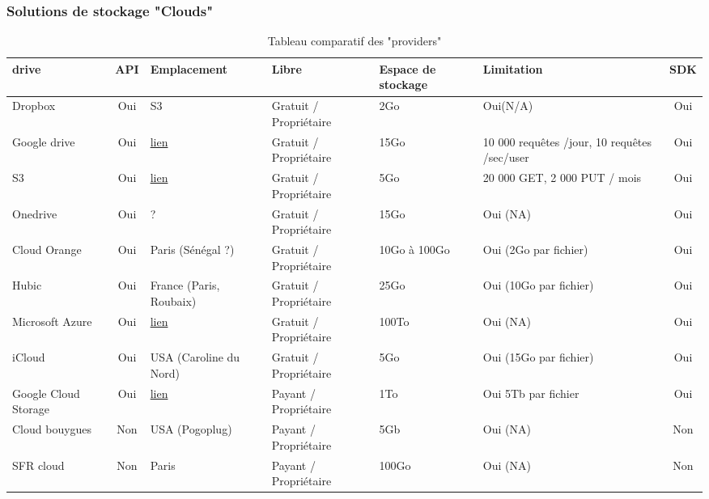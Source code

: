 \documentclass[10pt]{article}
\begin{document}
\subsubsection{Solutions de stockage "Clouds"}
\begin{table}[!h]
\caption{Tableau comparatif des "providers"}
\renewcommand{\arraystretch}{1.5}
\begin{center}
\begin{tabular}{|m{1in}|c|m{1in}|m{1in}|m{1in}|m{1in}|c|}
 \hline
 \bf\centering drive & \bf API & \bf Emplacement & \bf Libre & \bf\centering Espace de stockage & \bf Limitation & \bf SDK\\
 \hline
 \centering Dropbox & Oui & S3 & Gratuit / Propriétaire & 2Go & Oui(N/A) & Oui \\
 \hline
  \centering Google drive & Oui  & \href{http://www.google.com/about/datacenters/inside/locations/index.html}{lien} & Gratuit / Propriétaire & 15Go & 10 000 requêtes /jour, 10 requêtes /sec/user & Oui \\
 \hline
  \centering S3 & Oui  &  \href{http://aws.amazon.com/fr/about-aws/global-infrastructure/}{lien} & Gratuit / Propriétaire & 5Go & 20 000 GET, 2 000 PUT / mois & Oui \\
 \hline
  \centering Onedrive & Oui  & ? & Gratuit / Propriétaire & 15Go & Oui (NA) & Oui \\
 \hline
  \centering Cloud Orange & Oui  & Paris (Sénégal ?) & Gratuit / Propriétaire & 10Go à 100Go & Oui (2Go par fichier) & Oui \\
 \hline
  \centering Hubic & Oui  & France (Paris, Roubaix) & Gratuit / Propriétaire & 25Go & Oui (10Go par fichier) & Oui \\
 \hline
  \centering Microsoft Azure & Oui  &  \href{http://azure.microsoft.com/en-us/regions/}{lien} & Gratuit / Propriétaire & 100To & Oui (NA) & Oui \\
 \hline
  \centering iCloud & Oui  & USA (Caroline du Nord) & Gratuit / Propriétaire & 5Go & Oui (15Go par fichier) & Oui \\
 \hline
  \centering Google Cloud Storage & Oui  &  \href{http://www.google.com/about/datacenters/inside/locations/index.html}{lien}  & Payant  / Propriétaire & 1To & Oui 5Tb par fichier & Oui \\
 \hline
  \centering Cloud bouygues & Non  & USA (Pogoplug) & Payant  / Propriétaire & 5Gb & Oui (NA) & Non \\
 \hline
  \centering SFR cloud & Non & Paris & Payant / Propriétaire & 100Go & Oui (NA) & Non \\
 \hline
\end{tabular}
\end{center}
\end{table}
\end{document}
